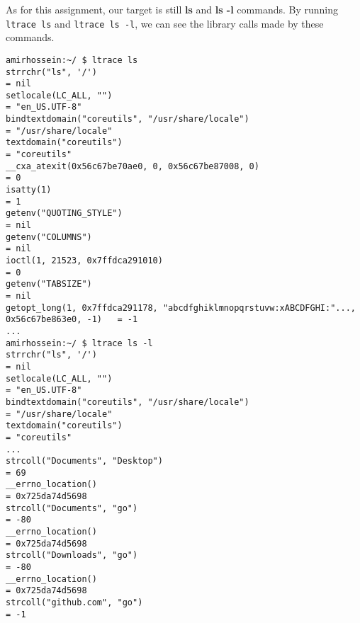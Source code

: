 \documentclass[12pt]{article}
\begin{document}
As for this assignment, our target is still \textbf{ls} and \textbf{ls -l} commands. By running \texttt{ltrace ls} and \texttt{ltrace ls -l}, we can see the library calls made by these commands.

{\fontsize{8pt}{10pt}\selectfont
\begin{verbatim}
amirhossein:~/ $ ltrace ls
strrchr("ls", '/')                                                                          = nil
setlocale(LC_ALL, "")                                                                       = "en_US.UTF-8"
bindtextdomain("coreutils", "/usr/share/locale")                                            = "/usr/share/locale"
textdomain("coreutils")                                                                     = "coreutils"
__cxa_atexit(0x56c67be70ae0, 0, 0x56c67be87008, 0)                                          = 0
isatty(1)                                                                                   = 1
getenv("QUOTING_STYLE")                                                                     = nil
getenv("COLUMNS")                                                                           = nil
ioctl(1, 21523, 0x7ffdca291010)                                                             = 0
getenv("TABSIZE")                                                                           = nil
getopt_long(1, 0x7ffdca291178, "abcdfghiklmnopqrstuvw:xABCDFGHI:"..., 0x56c67be863e0, -1)   = -1
...
amirhossein:~/ $ ltrace ls -l
strrchr("ls", '/')                                                                          = nil
setlocale(LC_ALL, "")                                                                       = "en_US.UTF-8"
bindtextdomain("coreutils", "/usr/share/locale")                                            = "/usr/share/locale"
textdomain("coreutils")                                                                     = "coreutils"
...
strcoll("Documents", "Desktop")                                                             = 69
__errno_location()                                                                          = 0x725da74d5698
strcoll("Documents", "go")                                                                  = -80
__errno_location()                                                                          = 0x725da74d5698
strcoll("Downloads", "go")                                                                  = -80
__errno_location()                                                                          = 0x725da74d5698
strcoll("github.com", "go")                                                                 = -1
\end{verbatim}
}
\end{document}
